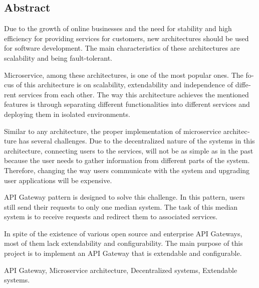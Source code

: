 \newpage
\thispagestyle{empty}
\begin{latin}
    \subsection*{Abstract}
    Due to the growth of online businesses and the need for stability and high efficiency for providing services for customers, new architectures should be used for software development. The main characteristics of these architectures are scalability and being fault-tolerant.

    Microservice, among these architectures, is one of the most popular ones. The focus of this architecture is on scalability, extendability and independence of different services from each other. The way this architecture achieves the mentioned features is through separating different functionalities into different services and deploying them in isolated environments.

    Similar to any architecture, the proper implementation of microservice architecture has several challenges. Due to the decentralized nature of the systems in this architecture, connecting users to the services, will not be as simple as in the past because the user needs to gather information from different parts of the system. Therefore, changing the way users communicate with the system and upgrading user applications will be expensive.

    API Gateway pattern is designed to solve this challenge. In this pattern, users still send their requests to only one median system. The task of this median system is to receive requests and redirect them to associated services.

    In spite of the existence of various open source and enterprise API Gateways, most of them lack extendability and configurability. The main purpose of this project is to implement an API Gateway that is extendable and configurable.

     API Gateway, Microservice architecture, Decentralized systems, Extendable systems.
\end{latin}
\cleardoublepage